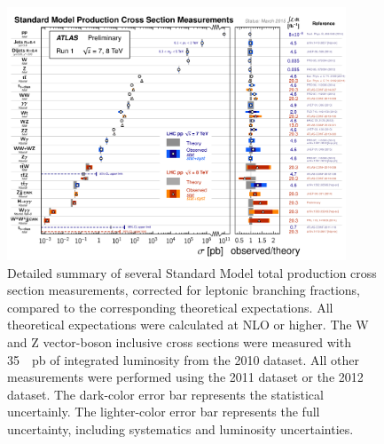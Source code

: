 \begin{figure}
\center
\includegraphics[width=0.9\textwidth]{Images/atlas/ATLASSM.png}
\caption{Detailed summary of several Standard Model total production cross section measurements, corrected for leptonic branching fractions, compared to the corresponding theoretical expectations. All theoretical expectations were calculated at NLO or higher. The W and Z vector-boson inclusive cross sections were measured with \SI{35}{\per\pico\barn} of integrated luminosity from the 2010 dataset. All other measurements were performed using the 2011 dataset or the 2012 dataset. The dark-color error bar represents the statistical uncertainly. The lighter-color error bar represents the full uncertainty, including systematics and luminosity uncertainties.}%
\label{pic:atlassm}
\end{figure}

